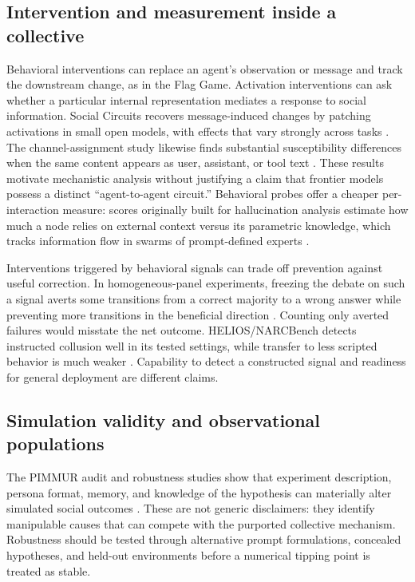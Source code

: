 \subsection{Intervention and measurement inside a collective}
Behavioral interventions can replace an agent's observation or message and track the downstream change, as in the Flag Game. Activation interventions can ask whether a particular internal representation mediates a response to social information. Social Circuits recovers message-induced changes by patching activations in small open models, with effects that vary strongly across tasks \citep{social-circuits}. The channel-assignment study likewise finds substantial susceptibility differences when the same content appears as user, assistant, or tool text \citep{not-just-rlhf-activations}. These results motivate mechanistic analysis without justifying a claim that frontier models possess a distinct ``agent-to-agent circuit.'' Behavioral probes offer a cheaper per-interaction measure: scores originally built for hallucination analysis estimate how much a node relies on external context versus its parametric knowledge, which tracks information flow in swarms of prompt-defined experts \citep{behavioral-probes-information-flow}.

Interventions triggered by behavioral signals can trade off prevention against useful correction. In homogeneous-panel experiments, freezing the debate on such a signal averts some transitions from a correct majority to a wrong answer while preventing more transitions in the beneficial direction \citep{homogeneous-panel-collapse}. Counting only averted failures would misstate the net outcome. HELIOS/NARCBench detects instructed collusion well in its tested settings, while transfer to less scripted behavior is much weaker \citep{narcbench-helios}. Capability to detect a constructed signal and readiness for general deployment are different claims.

\subsection{Simulation validity and observational populations}
The PIMMUR audit and robustness studies show that experiment description, persona format, memory, and knowledge of the hypothesis can materially alter simulated social outcomes \citep{pimmur-principles,prev-robustness-audits}. These are not generic disclaimers: they identify manipulable causes that can compete with the purported collective mechanism. Robustness should be tested through alternative prompt formulations, concealed hypotheses, and held-out environments before a numerical tipping point is treated as stable.

